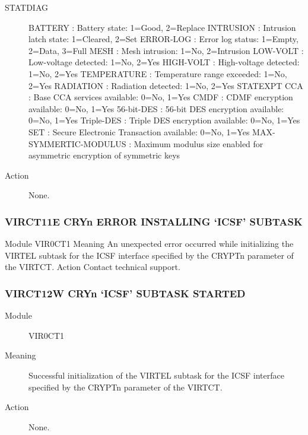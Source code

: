 \documentclass[letterpaper,10pt,english]{sphinxmanual}
\begin{document}
\begin{description}
\item[{STATDIAG}] \leavevmode
BATTERY : Battery state: 1=Good, 2=Replace INTRUSION : Intrusion latch state: 1=Cleared, 2=Set ERROR-LOG : Error log status: 1=Empty, 2=Data, 3=Full MESH : Mesh intrusion: 1=No, 2=Intrusion
LOW-VOLT : Low-voltage detected: 1=No, 2=Yes HIGH-VOLT : High-voltage detected: 1=No, 2=Yes
TEMPERATURE : Temperature range exceeded: 1=No, 2=Yes RADIATION : Radiation detected: 1=No, 2=Yes
STATEXPT
CCA : Base CCA services available: 0=No, 1=Yes CMDF : CDMF encryption available: 0=No, 1=Yes
56-bit-DES : 56-bit DES encryption available: 0=No, 1=Yes Triple-DES : Triple DES encryption available: 0=No, 1=Yes SET : Secure Electronic Transaction available: 0=No, 1=Yes
MAX-SYMMERTIC-MODULUS : Maximum modulus size enabled for asymmetric encryption of symmetric keys

\item[{Action}] \leavevmode
None.

\end{description}


\subsubsection{VIRCT11E CRYn ERROR INSTALLING ‘ICSF’ SUBTASK}
\label{\detokenize{messages:virct11e-cryn-error-installing-icsf-subtask}}
Module
VIR0CT1
Meaning
An unexpected error occurred while initializing the VIRTEL subtask for the ICSF interface specified by the CRYPTn parameter of the VIRTCT.
Action
Contact technical support.


\subsubsection{VIRCT12W CRYn ‘ICSF’ SUBTASK STARTED}
\label{\detokenize{messages:virct12w-cryn-icsf-subtask-started}}\begin{description}
\item[{Module}] \leavevmode
VIR0CT1

\item[{Meaning}] \leavevmode
Successful initialization of the VIRTEL subtask for the ICSF interface specified by the CRYPTn parameter of the VIRTCT.

\item[{Action}] \leavevmode
None.

\end{description}
\end{document}
